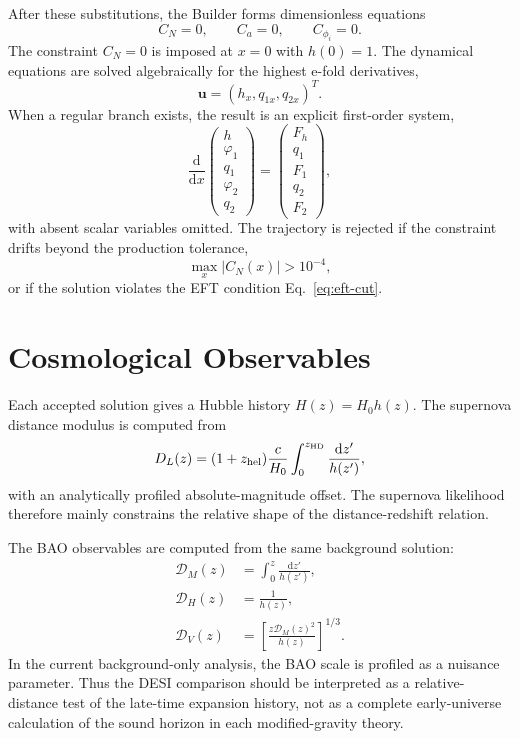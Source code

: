 \documentclass[aps,prd,twocolumn,superscriptaddress,nofootinbib,longbibliography]{revtex4-2}
\newcommand{\dd}{\mathrm{d}}
\newcommand{\calD}{\mathcal{D}}
\newcommand{\varphione}{\varphi_1}
\newcommand{\varphitwo}{\varphi_2}
\begin{document}
After these substitutions, the Builder forms dimensionless equations
\begin{equation}
C_N=0,\qquad C_a=0,\qquad C_{\phi_i}=0.
\end{equation}
The constraint $C_N=0$ is imposed at $x=0$ with $h(0)=1$.  The dynamical equations are solved algebraically for the highest e-fold derivatives,
\begin{equation}
\bm u=(h_x,q_{1x},q_{2x})^T.
\end{equation}
When a regular branch exists, the result is an explicit first-order system,
\begin{equation}
\frac{\dd}{\dd x}
\begin{pmatrix}
h\\ \varphione\\ q_1\\ \varphitwo\\ q_2
\end{pmatrix}
=
\begin{pmatrix}
F_h\\ q_1\\ F_1\\ q_2\\ F_2
\end{pmatrix},
\label{eq:first-order}
\end{equation}
with absent scalar variables omitted.  The trajectory is rejected if the constraint drifts beyond the production tolerance,
\begin{equation}
\max_x|C_N(x)|>10^{-4},
\label{eq:constraint-cut}
\end{equation}
or if the solution violates the EFT condition Eq.~\eqref{eq:eft-cut}.

\section{Cosmological Observables}
\label{sec:observables}

Each accepted solution gives a Hubble history $H(z)=H_0h(z)$.  The supernova distance modulus is computed from
\begin{equation}
D_L(z)=(1+z_{\rm hel})\frac{c}{H_0}
\int_0^{z_{\rm HD}}\frac{\dd z'}{h(z')},
\label{eq:luminosity-distance}
\end{equation}
with an analytically profiled absolute-magnitude offset.  The supernova likelihood therefore mainly constrains the relative shape of the distance-redshift relation.

The BAO observables are computed from the same background solution:
\begin{align}
\calD_M(z)&=\int_0^z\frac{\dd z'}{h(z')},\\
\calD_H(z)&=\frac{1}{h(z)},\\
\calD_V(z)&=\left[\frac{z\calD_M(z)^2}{h(z)}\right]^{1/3}.
\label{eq:bao}
\end{align}
In the current background-only analysis, the BAO scale is profiled as a nuisance parameter.  Thus the DESI comparison should be interpreted as a relative-distance test of the late-time expansion history, not as a complete early-universe calculation of the sound horizon in each modified-gravity theory.
\end{document}

